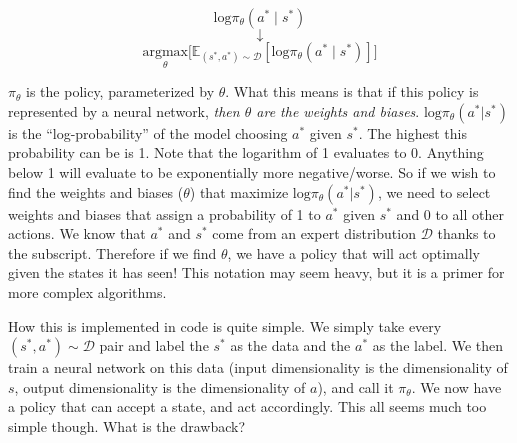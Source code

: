 \begin{flushleft}
   $$\mathrm{log}\pi_\theta(a^\ast\mid s^\ast)$$
   $$\downarrow$$
   $$\underset{\theta}{\textrm{argmax}}\biggl[\mathbb{E}_{(s^\ast,a^\ast) \sim \mathcal{D}}[\mathrm{log}\pi_\theta(a^\ast \mid s^\ast)]\biggr]$$

   $\pi_\theta$ is the policy, parameterized by $\theta$. What this means is that if this policy is represented by a neural network, \textit{then $\theta$ are the weights and biases}. $\mathrm{log}\pi_\theta(a^\ast|s^\ast)$ is the ``log-probability'' of the model choosing $a^\ast$ given $s^\ast$. The highest this probability can be is 1. Note that the logarithm of 1 evaluates to 0. Anything below 1 will evaluate to be exponentially more negative/worse. So if we wish to find the weights and biases ($\theta$) that maximize $\mathrm{log}\pi_\theta(a^\ast|s^\ast)$, we need to select weights and biases that assign a probability of 1 to $a^\ast$ given $s^\ast$ and 0 to all other actions. We know that $a^\ast$ and $s^\ast$ come from an expert distribution $\mathcal{D}$ thanks to the subscript. Therefore if we find $\theta$, we have a policy that will act optimally given the states it has seen! This notation may seem heavy, but it is a primer for more complex algorithms. \break

   How this is implemented in code is quite simple. We simply take every $(s^\ast,a^\ast) \sim \mathcal{D}$ pair and label the $s^\ast$ as the data and the $a^\ast$ as the label. We then train a neural network on this data (input dimensionality is the dimensionality of $s$, output dimensionality is the dimensionality of $a$), and call it $\pi_\theta$. We now have a policy that can accept a state, and act accordingly. This all seems much too simple though. What is the drawback?
\end{flushleft}

